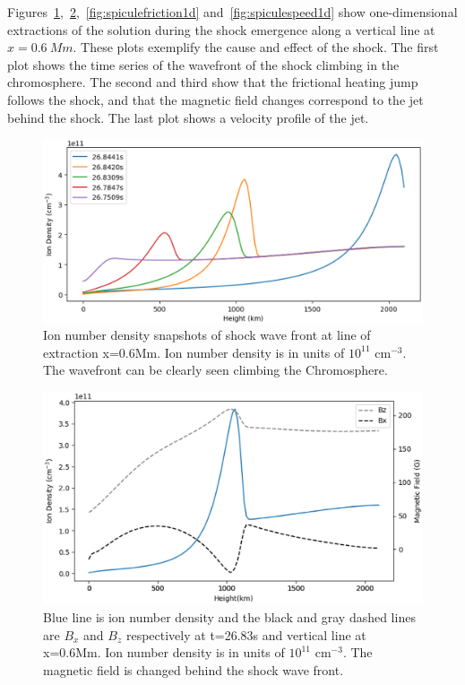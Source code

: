 \documentclass[12pt,upcase]{umlthesis}
\begin{document}
Figures~\ref{fig:shockwavefront1d},~\ref{fig:spiculefield1d},~\ref{fig:spiculefriction1d} and~\ref{fig:spiculespeed1d} show one-dimensional extractions of the solution during the shock emergence along a vertical line at $x=0.6~Mm$.  These plots exemplify the cause and effect of the shock. The first plot shows the time series of the wavefront of the shock climbing in the chromosphere. The second and third show that the frictional heating jump follows the shock, and that the magnetic field changes correspond to the jet behind the shock. The last plot shows a velocity profile of the jet.

\begin{figure}[ht!]
	\centering
    \includegraphics[width=1\textwidth]{images/shockwavefront1d.eps}
    \caption{Ion number density snapshots of shock wave front at line of extraction x=0.6Mm. Ion number density is in units of $10^{11}$ cm$^{-3}$. The wavefront can be clearly seen climbing the Chromosphere.}\label{fig:shockwavefront1d}
\end{figure}

\begin{figure}[ht!]
	\centering
    \includegraphics[width=1\textwidth]{images/spiculefield1d.eps}
    \caption{Blue line is ion number density and the black and gray dashed lines are $B_x$ and $B_z$ respectively at t=26.83s and vertical line at x=0.6Mm. Ion number density is in units of $10^{11}$ cm$^{-3}$. The magnetic field is changed behind the shock wave front.}\label{fig:spiculefield1d}
\end{figure}
\end{document}
